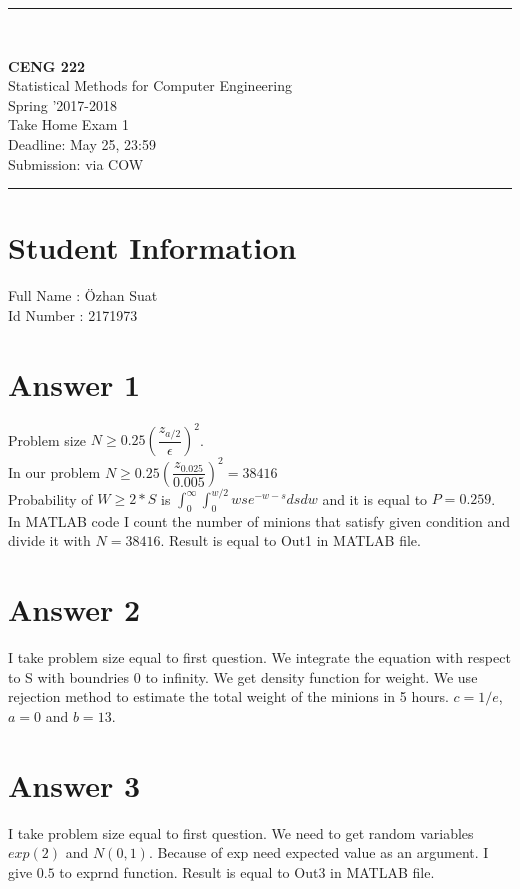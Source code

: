 \documentclass[12pt]{article}
\newcommand{\HRule}{\rule{\linewidth}{1mm}}
\begin{document}
\noindent
\HRule \\[3mm]
\begin{flushright}

                                         \LARGE \textbf{CENG 222}  \\[4mm]
                                         \Large Statistical Methods for Computer Engineering \\[4mm]
                                        \normalsize      Spring '2017-2018 \\
                                           \Large   Take Home Exam 1 \\
                    \normalsize Deadline: May 25, 23:59 \\
                    \normalsize Submission: via COW
\end{flushright}
\HRule

\section*{Student Information }
Full Name : Özhan Suat \\
Id Number : 2171973 \\

\section*{Answer 1}

Problem size $N \geq 0.25 \left(\dfrac{z_{a/2}}{\epsilon}\right)^2 $.\\ In our problem $N \geq 0.25 \left(\dfrac{z_{0.025}}{0.005}\right)^2 = 38416$\\
Probability of $W \geq 2*S$ is $\int_{0}^{\infty} \int_{0}^{w/2} wse^{-w-s} ds dw$
and it is equal to $P = 0.259$.
In MATLAB code I count the number of minions that satisfy given condition and divide it with $N = 38416$. Result is equal to Out1 in MATLAB file.

\section*{Answer 2}
I take problem size equal to first question. We integrate the equation with respect to S with boundries 0 to infinity. We get density function for weight. We use rejection method to estimate the total weight of the minions in 5 hours. $c = 1/e$, $ a = 0$ and $b=13$.

\section*{Answer 3}

I take problem size equal to first question. We need to get random variables $exp(2)$ and $N(0,1)$. Because of exp need expected value as an argument. I give $0.5$ to exprnd function. Result is equal to Out3 in MATLAB file.
\end{document}
